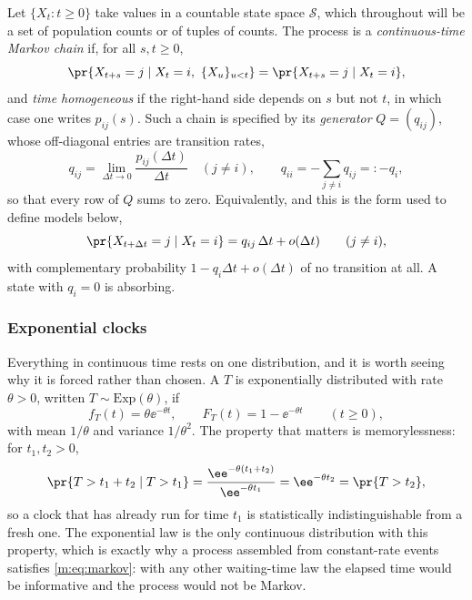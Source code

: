 Let $\{X_t : t\ge0\}$ take values in a countable state space $\mathcal S$, which
throughout will be a set of population counts or of tuples of counts. The process
is a \emph{continuous-time Markov chain} if, for all $s,t\ge0$,
\begin{equation}
\label{m:eq:markov}
\pr{X_{t+s}=j \mid X_t=i,\ \{X_u\}_{u<t}} = \pr{X_{t+s}=j\mid X_t=i},
\end{equation}
and \emph{time homogeneous} if the right-hand side depends on $s$ but not $t$, in
which case one writes $p_{ij}(s)$. Such a chain is specified by its
\emph{generator} $Q=(q_{ij})$, whose off-diagonal entries are transition rates,
\begin{equation}
\label{m:eq:generator}
q_{ij} = \lim_{\Delta t\to0}\frac{p_{ij}(\Delta t)}{\Delta t}\quad(j\neq i),
\qquad
q_{ii} = -\sum_{j\neq i}q_{ij} =: -q_i ,
\end{equation}
so that every row of $Q$ sums to zero. Equivalently, and this is the form used to
define models below,
\begin{equation}
\label{m:eq:infinitesimal}
\pr{X_{t+\Delta t}=j\mid X_t=i} = q_{ij}\,\Delta t + o(\Delta t)
\qquad(j\neq i),
\end{equation}
with complementary probability $1-q_i\Delta t+o(\Delta t)$ of no transition at all.
A state with $q_i=0$ is absorbing.

\subsubsection{Exponential clocks}
\label{m:sec:exp}

Everything in continuous time rests on one distribution, and it is worth seeing
why it is forced rather than chosen. A \rv{} $T$ is exponentially distributed with
rate $\theta>0$, written $T\sim\mathrm{Exp}(\theta)$, if
\begin{equation}
\label{m:eq:expdef}
f_T(t) = \theta\ee^{-\theta t},
\qquad
F_T(t) = 1-\ee^{-\theta t}
\qquad(t\ge0),
\end{equation}
with mean $1/\theta$ and variance $1/\theta^2$. The property that matters is
memorylessness: for $t_1,t_2>0$,
\begin{equation}
\label{m:eq:memoryless}
\pr{T>t_1+t_2\mid T>t_1}
= \frac{\ee^{-\theta(t_1+t_2)}}{\ee^{-\theta t_1}}
= \ee^{-\theta t_2}
= \pr{T>t_2},
\end{equation}
so a clock that has already run for time $t_1$ is statistically indistinguishable
from a fresh one. The exponential law is the only continuous distribution with this
property, which is exactly why a process assembled from constant-rate events
satisfies \cref{m:eq:markov}: with any other waiting-time law the elapsed time would
be informative and the process would not be Markov.

